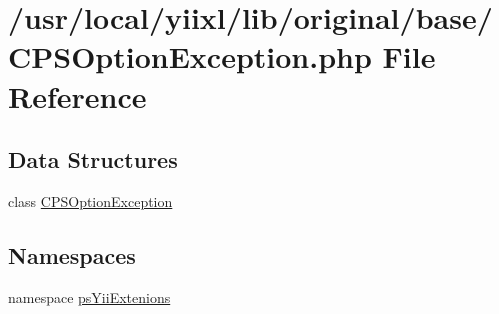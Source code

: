 \hypertarget{CPSOptionException_8php}{
\section{/usr/local/yiixl/lib/original/base/CPSOptionException.php File Reference}
\label{CPSOptionException_8php}
}
\subsection*{Data Structures}
\begin{DoxyCompactItemize}
\item 
class \hyperlink{classCPSOptionException}{CPSOptionException}
\end{DoxyCompactItemize}
\subsection*{Namespaces}
\begin{DoxyCompactItemize}
\item 
namespace \hyperlink{namespacepsYiiExtenions}{psYiiExtenions}
\end{DoxyCompactItemize}
